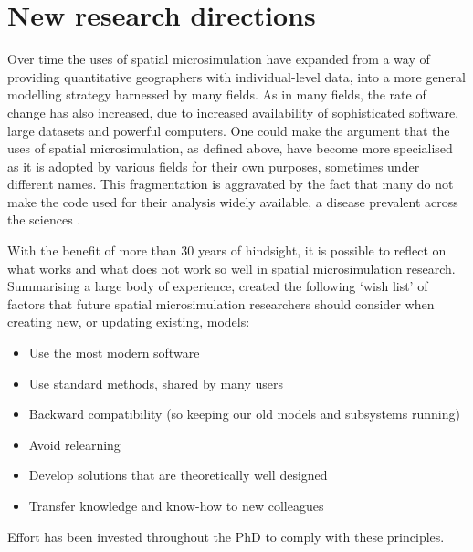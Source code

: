 \section{New research directions}
Over time the uses of spatial microsimulation have expanded from a way of
providing quantitative geographers with individual-level data, into a more
general modelling strategy harnessed by many fields. As in many fields, the
rate of change has also increased, due to increased availability of
sophisticated software, large datasets and powerful
computers. One could make the argument that the
uses of spatial microsimulation, as defined above, have become more specialised
as it is adopted by various fields for their own purposes, sometimes under
different names. This fragmentation is aggravated by the fact that
many do not make the code used for their analysis widely available, a
disease prevalent across the sciences \citep{Ince2012}.

With the benefit of more than 30 years of hindsight, it is possible to reflect
on what works and what does not work so well in spatial microsimulation
research. Summarising a large body of experience,
\citet[p.~197]{Holm2013-design-principles} created the following `wish list' of
factors that future spatial microsimulation researchers should consider
when creating new, or updating existing, models:

\begin{itemize}
\item  Use the most modern software
\item  Use standard methods, shared by many users
\item  Backward compatibility (so keeping our old models and subsystems running)
\item  Avoid relearning
\item  Develop solutions that are theoretically well designed
\item  Transfer knowledge and know-how to new colleagues
\end{itemize}

Effort has been invested throughout the PhD to comply with these
principles. %
\label{s:bigdata-gps}
\label{s:applications}

